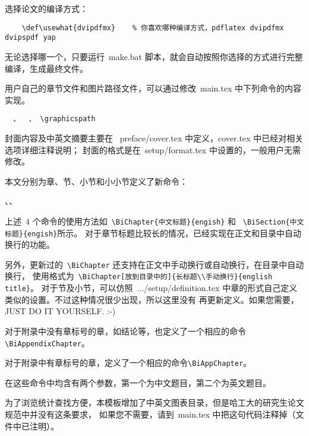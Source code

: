 选择论文的编译方式：\vspace{-5pt}
\begin{verbatim}
    \def\usewhat{dvipdfmx}    % 你喜欢哪种编译方式，pdflatex dvipdfmx dvipspdf yap
\end{verbatim}
无论选择哪一个，只要运行~make.bat 脚本，就会自动按照你选择的方式进行完整编译，生成最终文件。

用户自己的章节文件和图片路径文件，可以通过修改~main.tex 中下列命令的内容实现。\vspace{-5pt}
\begin{verbatim}
  、  、 \graphicspath
\end{verbatim}

封面内容及中英文摘要主要在~ preface/cover.tex 中定义，cover.tex 中已经对相关选项详细注释说明；
封面的格式是在~setup/format.tex 中设置的，一般用户无需修改。


\label{Tricks:Contents}
本文分别为章、节、小节和小小节定义了新命令：

\begin{verb}
\BiChapter、\BiSection、\BiSubsubsection
\end{verb}

上述~4 个命令的使用方法如~\verb"\BiChapter{中文标题}{engish}" 和 ~\verb"\BiSection{中文标题}{engish}"所示。
对于章节标题比较长的情况，已经实现在正文和目录中自动换行的功能。

另外，更新过的~\verb"\BiChapter" 还支持在正文中手动换行或自动换行，在目录中自动换行，
使用格式为~\verb"\BiChapter[放到目录中的]{长标题\\手动换行}{english title}"。
对于节及小节，可以仿照~.../setup/definition.tex 中章的形式自己定义类似的设置。不过这种情况很少出现，所以这里没有
再更新定义。如果您需要，JUST DO IT YOURSELF. :-)

对于附录中没有章标号的章，如结论等，也定义了一个相应的命令\verb"\BiAppendixChapter"。

对于附录中有章标号的章，定义了一个相应的命令\verb"\BiAppChapter"。

在这些命令中均含有两个参数，第一个为中文题目，第二个为英文题目。

为了浏览统计查找方便，本模板增加了中英文图表目录，但是哈工大的研究生论文规范中并没有这条要求，
如果您不需要，请到~main.tex 中把这句代码注释掉（文件中已注明）。
\begin{verb}
   
\end{verb}

